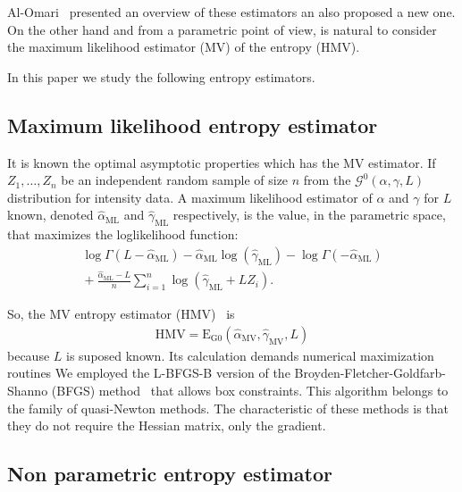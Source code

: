\documentclass[journal]{IEEEtran}
\begin{document}
Al-Omari~\cite{AlOmari2013} presented an overview of these estimators an also proposed a new one. On the other hand and from a parametric point of view, is natural to consider the maximum likelihood estimator (MV) of the entropy (HMV).

In this paper we study the following entropy estimators.

\subsection{Maximum likelihood entropy estimator}

It is known the optimal asymptotic properties which has the MV estimator. If $Z_1,\dots, Z_n$ be an independent random sample of size $n$ from the $\mathcal G^0(\alpha,\gamma,L)$ distribution for intensity data.
A maximum likelihood estimator of $\alpha$ and $\gamma$ for $L$ known, denoted $\widehat\alpha_{\text{ML}}$ and $\widehat\gamma_{\text{ML}}$ respectively, is the value, in the parametric space, that maximizes the loglikelihood function:
\begin{align}
	\log \Gamma(L-\widehat\alpha_{\text{ML}})-
	\widehat\alpha_{\text{ML}}\log(\widehat\gamma_{\text{ML}})-\log\Gamma(-\widehat\alpha_{\text{ML}}) \nonumber \\
	\mbox{}+\frac{\widehat\alpha_{\text{ML}}-L}{n} \sum_{i=1}^n\log(\widehat\gamma_{\text{ML}}+L Z_i).
	\label{ML}
\end{align}

So, the MV entropy estimator (HMV)~\cite{CaseBerg01} is 
\begin{align}
	\text{HMV}=\text{E}_{\text{G0}}(\hat{\alpha}_{\text{MV}},\hat{\gamma}_{\text{MV}},L)
\end{align}
because $L$ is suposed known. Its calculation demands numerical maximization routines
We employed the L-BFGS-B version of the Broyden-Fletcher-Goldfarb-Shanno (BFGS) method~\cite{Luenberger2008} that allows box constraints.
This algorithm belongs to the family of quasi-Newton methods. 
The characteristic of these methods is that they do not require the Hessian matrix, only the gradient.



\subsection{Non parametric entropy estimator}
\label{nonpar}
\end{document}
